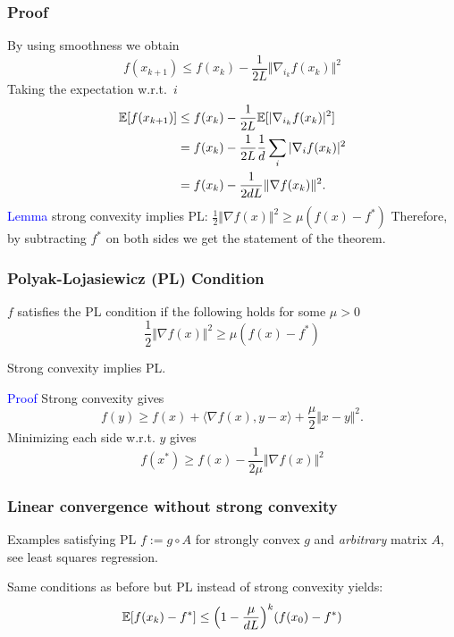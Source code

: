 \documentclass[aspectratio=149]{beamer}
\begin{document}
\begin{frame}
  \frametitle{Proof}
  By using smoothness we obtain
  \begin{equation}
    f(x_{k+1}) \le f(x_k) - \frac{1}{2L} \Vert \nabla_{i_k} f(x_k) \Vert^2
  \end{equation}
  Taking the expectation w.r.t.\ $i$
  \begin{equation}
    \begin{aligned}
      \mathbb{E} [f(x_{k+1})] &\le f(x_k) - \frac{1}{2L} \mathbb{E}[\vert \nabla_{i_k} f(x_k) \vert^2] \\
      &= f(x_k) - \frac{1}{2L}\frac{1}{d} \sum_{i} \vert \nabla_i f(x_k) \vert^2 \\
      &= f(x_k) - \frac{1}{2 d L} \Vert \nabla f(x_k) \Vert^2.
    \end{aligned}
  \end{equation}
  \textcolor{blue}{Lemma} strong convexity implies PL: $\frac12 \Vert \nabla f(x) \Vert^2 \ge \mu (f(x)-f^*)$
  Therefore, by subtracting $f^*$ on both sides we get the statement of the theorem.
\end{frame}

\begin{frame}
  \frametitle{Polyak-Lojasiewicz (PL) Condition}
  \begin{definition}
    $f$ satisfies the PL condition if the following holds for some $\mu>0$
    \begin{equation}
      \frac12 \Vert \nabla f(x) \Vert^2 \ge \mu (f(x)-f^*)
    \end{equation}
  \end{definition}

  \begin{lemma}%
    Strong convexity implies PL.
  \end{lemma}
  \textcolor{blue}{Proof}
    Strong convexity gives
    \begin{equation}
      f(y) \ge f(x) + \langle \nabla f(x), y-x \rangle + \frac{\mu}{2} \Vert x-y \Vert^2.
    \end{equation}
    Minimizing each side w.r.t. $y$ gives
    \begin{equation}
      f(x^*) \ge f(x) - \frac{1}{2 \mu} \Vert \nabla f(x) \Vert^2
    \end{equation}
\end{frame}

\begin{frame}
  \frametitle{Linear convergence without strong convexity}
  \begin{block}{Examples satisfying PL}
    $f := g\circ A$ for strongly convex $g$ and \emph{arbitrary} matrix $A$, see least squares regression.
  \end{block}

  \begin{corollary}%
    Same conditions as before but PL instead of strong convexity yields:
    \begin{equation}
      \mathbb{E} [f(x_k)- f^*] \le {\left(1 - \frac{\mu}{d L}\right)}^k (f(x_0)-f^*)
    \end{equation}
  \end{corollary}
\end{frame}
\end{document}

